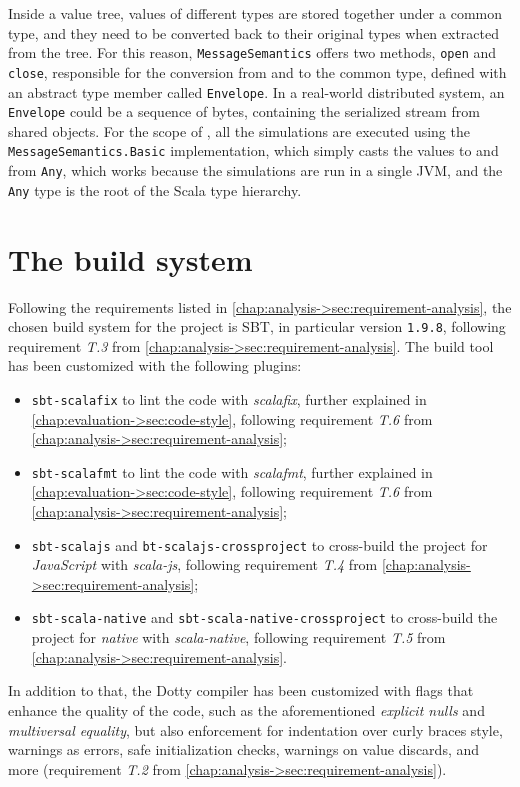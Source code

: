 Inside a value tree, values of different types are stored together under a common type, and they need to be converted back to their original types when extracted from the tree.
%
For this reason, \texttt{MessageSemantics} offers two methods, \texttt{open} and \texttt{close}, responsible for the conversion from and to the common type, defined with an abstract type member called \texttt{Envelope}.
%
In a real-world distributed system, an \texttt{Envelope} could be a sequence of bytes, containing the serialized stream from shared objects.
%
For the scope of \this, all the simulations are executed using the \texttt{MessageSemantics.Basic} implementation, which simply casts the values to and from \texttt{Any}, which works because the simulations are run in a single JVM, and the \texttt{Any} type is the root of the Scala type hierarchy.

\section{The build system}

Following the requirements listed in \cref{chap:analysis->sec:requirement-analysis}, the chosen build system for the project is \ac{SBT}, in particular version \texttt{1.9.8}, following requirement \textit{T.3} from \cref{chap:analysis->sec:requirement-analysis}.
%
The build tool has been customized with the following plugins:
\begin{itemize}
    \item \texttt{sbt-scalafix} to lint the code with \textit{scalafix}, further explained in \cref{chap:evaluation->sec:code-style}, following requirement \textit{T.6} from \cref{chap:analysis->sec:requirement-analysis};
    \item \texttt{sbt-scalafmt} to lint the code with \textit{scalafmt}, further explained in \cref{chap:evaluation->sec:code-style}, following requirement \textit{T.6} from \cref{chap:analysis->sec:requirement-analysis};
    \item \texttt{sbt-scalajs} and \texttt{bt-scalajs-crossproject} to cross-build the project for \textit{JavaScript} with \textit{scala-js}, following requirement \textit{T.4} from \cref{chap:analysis->sec:requirement-analysis};
    \item \texttt{sbt-scala-native} and \texttt{sbt-scala-native-crossproject} to cross-build the project for \textit{native} with \textit{scala-native}, following requirement \textit{T.5} from \cref{chap:analysis->sec:requirement-analysis}.
\end{itemize}
%
In addition to that, the Dotty compiler has been customized with flags that enhance the quality of the code, such as the aforementioned \textit{explicit nulls} and \textit{multiversal equality}, but also enforcement for indentation over curly braces style, warnings as errors, safe initialization checks, warnings on value discards, and more (requirement \textit{T.2} from \cref{chap:analysis->sec:requirement-analysis}).

